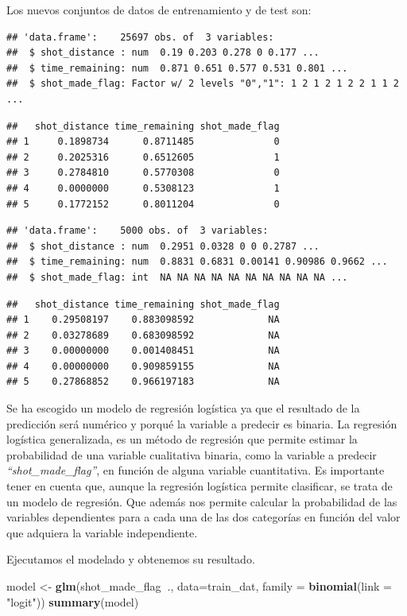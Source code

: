 \documentclass[
]{article}
\newenvironment{Shaded}{\begin{snugshade}}{\end{snugshade}}
\newcommand{\DataTypeTok}[1]{\textcolor[rgb]{0.13,0.29,0.53}{#1}}
\newcommand{\KeywordTok}[1]{\textcolor[rgb]{0.13,0.29,0.53}{\textbf{#1}}}
\newcommand{\NormalTok}[1]{#1}
\newcommand{\OperatorTok}[1]{\textcolor[rgb]{0.81,0.36,0.00}{\textbf{#1}}}
\newcommand{\StringTok}[1]{\textcolor[rgb]{0.31,0.60,0.02}{#1}}
\begin{document}
Los nuevos conjuntos de datos de entrenamiento y de test son:

\begin{verbatim}
## 'data.frame':    25697 obs. of  3 variables:
##  $ shot_distance : num  0.19 0.203 0.278 0 0.177 ...
##  $ time_remaining: num  0.871 0.651 0.577 0.531 0.801 ...
##  $ shot_made_flag: Factor w/ 2 levels "0","1": 1 2 1 2 1 2 2 1 1 2 ...
\end{verbatim}

\begin{verbatim}
##   shot_distance time_remaining shot_made_flag
## 1     0.1898734      0.8711485              0
## 2     0.2025316      0.6512605              1
## 3     0.2784810      0.5770308              0
## 4     0.0000000      0.5308123              1
## 5     0.1772152      0.8011204              0
\end{verbatim}

\begin{verbatim}
## 'data.frame':    5000 obs. of  3 variables:
##  $ shot_distance : num  0.2951 0.0328 0 0 0.2787 ...
##  $ time_remaining: num  0.8831 0.6831 0.00141 0.90986 0.9662 ...
##  $ shot_made_flag: int  NA NA NA NA NA NA NA NA NA NA ...
\end{verbatim}

\begin{verbatim}
##   shot_distance time_remaining shot_made_flag
## 1    0.29508197    0.883098592             NA
## 2    0.03278689    0.683098592             NA
## 3    0.00000000    0.001408451             NA
## 4    0.00000000    0.909859155             NA
## 5    0.27868852    0.966197183             NA
\end{verbatim}

Se ha escogido un modelo de regresión logística ya que el resultado de
la predicción será numérico y porqué la variable a predecir es binaria.
La regresión logística generalizada, es un método de regresión que
permite estimar la probabilidad de una variable cualitativa binaria,
como la variable a predecir \emph{``shot\_made\_flag''}, en función de
alguna variable cuantitativa. Es importante tener en cuenta que, aunque
la regresión logística permite clasificar, se trata de un modelo de
regresión. Que además nos permite calcular la probabilidad de las
variables dependientes para a cada una de las dos categorías en función
del valor que adquiera la variable independiente.

Ejecutamos el modelado y obtenemos su resultado.

\begin{Shaded}
\begin{Highlighting}[]
\NormalTok{model <-}\StringTok{ }\KeywordTok{glm}\NormalTok{(shot_made_flag}\OperatorTok{~}\NormalTok{., }\DataTypeTok{data=}\NormalTok{train_dat, }\DataTypeTok{family =} \KeywordTok{binomial}\NormalTok{(}\DataTypeTok{link =} \StringTok{"logit"}\NormalTok{))}
\KeywordTok{summary}\NormalTok{(model)}
\end{Highlighting}
\end{Shaded}
\end{document}
